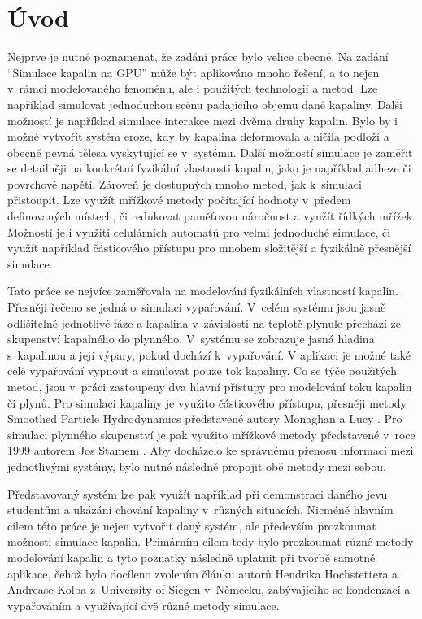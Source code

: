 \chapter{Úvod}
\label{chapter:uvod}
Nejprve je nutné poznamenat, že zadání práce bylo velice obecné. Na zadání \enquote{Simulace kapalin na GPU} může být aplikováno mnoho řešení, a to nejen v~rámci modelovaného fenoménu, ale i použitých technologií a metod. Lze například simulovat jednoduchou scénu padajícího objemu dané kapaliny. Další možností je například simulace interakce mezi dvěma druhy kapalin. Bylo by i možné vytvořit systém eroze, kdy by kapalina deformovala a ničila podloží a obecně pevná tělesa vyskytující se v~systému. Další možností simulace je zaměřit se detailněji na konkrétní fyzikální vlastnosti kapalin, jako je například adheze či povrchové napětí. Zároveň je dostupných mnoho metod, jak k~simulaci přistoupit. Lze využít mřížkové metody počítající hodnoty v~předem definovaných místech, či redukovat paměťovou náročnost a využít řídkých mřížek. Možností je i využití celulárních automatů pro velmi jednoduché simulace, či využít například částicového přístupu pro mnohem složitější a fyzikálně přesnější simulace.

Tato práce se nejvíce zaměřovala na modelování fyzikálních vlastností kapalin. Přesněji řečeno se jedná o~simulaci vypařování. V~celém systému jsou jasně odlišitelné jednotlivé fáze a kapalina v~závislosti na teplotě plynule přechází ze skupenství kapalného do plynného. V~systému se zobrazuje jasná hladina s~kapalinou a její výpary, pokud dochází k~vypařování. V aplikaci je možné také celé vypařování vypnout a simulovat pouze tok kapaliny. Co se týče použitých metod, jsou v~práci zastoupeny dva hlavní přístupy pro modelování toku kapalin či plynů. Pro simulaci kapaliny je využito částicového přístupu, přesněji metody Smoothed Particle Hydrodynamics představené autory Monaghan \cite{Monaghan77} a Lucy \cite{Lucy77}. Pro simulaci plynného skupenství je pak využito mřížkové metody představené v~roce 1999 autorem Jos Stamem \cite{Stam99}. Aby docházelo ke správnému přenosu informací mezi jednotlivými systémy, bylo nutné následně propojit obě metody mezi sebou.

Představovaný systém lze pak využít například při demonstraci daného jevu studentům a ukázání chování kapaliny v~různých situacích. Nicméně hlavním cílem této práce je nejen vytvořit daný systém, ale především prozkoumat možnosti simulace kapalin. Primárním cílem tedy bylo prozkoumat různé metody modelování kapalin a tyto poznatky následně uplatnit při tvorbě samotné aplikace, čehož bylo docíleno  zvolením článku \cite{Evap&Cond} autorů Hendrika Hochstettera a Andrease Kolba z~University of Siegen v~Německu, zabývajícího se kondenzací a vypařováním a využívající dvě různé metody simulace.


